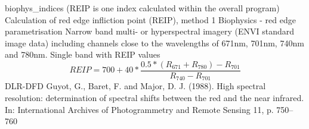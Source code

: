 %
{ %
biophys\_indices (REIP is one index calculated within the overall program)
}
%
{ %
Calculation of red edge infliction point (REIP), method 1
}
%
{ %
Biophysics - red edge parametrisation
}
%
{ %
Narrow band multi- or hyperspectral imagery (ENVI standard image data) including channels close to the wavelengths of 671nm, 701nm, 740nm and 780nm.\bigskip
}
%
{ %
Single band with REIP values
}
%
{ %
\begin{displaymath}
REIP =  700+40*\frac{0.5*(R_{671}+R_{780})-R_{701}}{R_{740}-R_{701}}
\end{displaymath}
}
%
{ %
DLR-DFD
}
%
{ %
Guyot, G., Baret, F. and Major, D. J. (1988). High spectral resolution: determination of spectral shifts between the red and the near infrared. In: International Archives of Photogrammetry and Remote Sensing 11, p. 750–760
}

